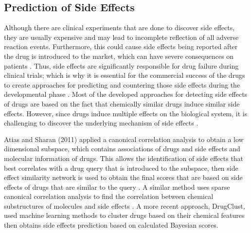 \subsection{Prediction of Side Effects}
Although there are clinical experiments that are done to discover side effects, they are usually expensive and may lead to incomplete reflection of all adverse reaction events. Furthermore, this could cause side effects being reported after the drug is introduced to the market, which can have severe consequences on patients \cite{dimitri_drugclust:_2017}. Thus, side effects are significantly responsible for drug failure during clinical trials; which is why it is essential for the commercial success of the drugs to create approaches for predicting and countering those side effects during the developmental phase \cite{mizutani_relating_2012}. Most of the developed approaches for detecting side effects of drugs are based on the fact that chemically similar drugs induce similar side effects. However, since drugs induce multiple effects on the biological system, it is challenging to discover the underlying mechanism of side effects \cite{dimitri_drugclust:_2017}.

Atias and Sharan (2011) applied a canonical correlation analysis to obtain a low dimensional subspace, which contains associations of drugs and side effects and molecular information of drugs. This allows the identification of side effects that best correlates with a drug query that is introduced to the subspace, then side effect similarity network is used to obtain the final scores that are based on side effects of drugs that are similar to the query \cite{atias_algorithmic_2011}. A similar method uses sparse canonical correlation analysis to find the correlation between chemical substructures of molecules and side effects \cite{pauwels_predicting_2011}. A more recent approach, DrugClust, used machine learning methods to cluster drugs based on their chemical features then obtains side effects prediction based on calculated Bayesian scores\cite{dimitri_drugclust:_2017}.

